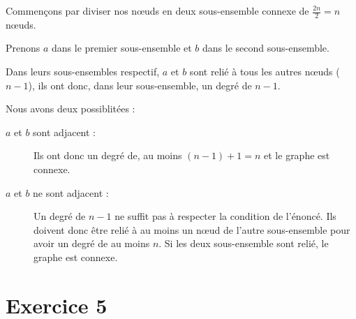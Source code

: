 \documentclass[fontsize=10pt]{article}
\begin{document}
Commençons par diviser nos nœuds en deux sous-ensemble connexe de
$\frac{2n}{2} = n$ nœuds.

Prenons $a$ dans le premier sous-ensemble et $b$
dans le second sous-ensemble.

Dans leurs sous-ensembles respectif, $a$ et $b$
sont relié à tous les autres nœuds ($n-1$), ils ont donc, dans leur sous-ensemble, un
degré de $n - 1$.

Nous avons deux possiblitées :
\begin{description}
    \item [$a$ et $b$ sont adjacent :]
        Ils ont donc un degré de, au moins $(n - 1) + 1 = n$ et le graphe est
        connexe.  \item [$a$ et $b$ ne sont adjacent :] Un degré de $n-1$ ne suffit pas à respecter la condition de l'énoncé.  Ils doivent donc être relié à au moins un nœud de l'autre sous-ensemble
        pour avoir un degré de au moins $n$. Si les deux sous-ensemble sont
        relié, le graphe est connexe.
\end{description}

\section*{Exercice 5}
\end{document}
